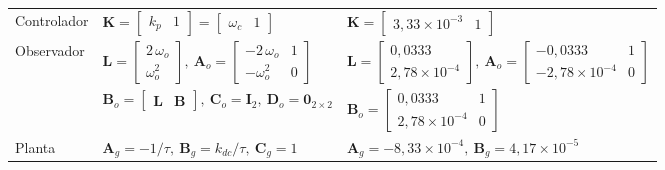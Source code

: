 \begin{table}[H]
{\begin{tabular}{lll}
Controlador &
$\mathbf{K} = \begin{bmatrix} k_p & 1 \end{bmatrix} = \begin{bmatrix} \omega_c & 1 \end{bmatrix}$ &
$\mathbf{K} = \begin{bmatrix} 3{,}33\times10^{-3} & 1 \end{bmatrix}$ \\
Observador &
$\mathbf{L} = \begin{bmatrix} 2\,\omega_o \\ \omega_o^2 \end{bmatrix},\
\mathbf{A}_o = \begin{bmatrix} -2\,\omega_o & 1 \\ -\omega_o^2 & 0 \end{bmatrix}$ &
$\mathbf{L} = \begin{bmatrix} 0{,}0333 \\ 2{,}78\times10^{-4} \end{bmatrix},\
\mathbf{A}_o = \begin{bmatrix} -0{,}0333 & 1 \\ -2{,}78\times10^{-4} & 0 \end{bmatrix}$ \\
 &
$\mathbf{B}_o = \begin{bmatrix} \mathbf{L} & \mathbf{B} \end{bmatrix},\
\mathbf{C}_o = \mathbf{I}_2,\ \mathbf{D}_o = \mathbf{0}_{2\times 2}$ &
$\mathbf{B}_o = \begin{bmatrix} 0{,}0333 & 1 \\ 2{,}78\times10^{-4} & 0 \end{bmatrix}$ \\
Planta &
$\mathbf{A}_g = -1/\tau,\ \mathbf{B}_g = k_{dc}/\tau,\ \mathbf{C}_g = 1$ &
$\mathbf{A}_g = -8{,}33\times10^{-4},\ \mathbf{B}_g = 4{,}17\times10^{-5}$ \\
\bottomrule
\end{tabular}%
}
\end{table}


